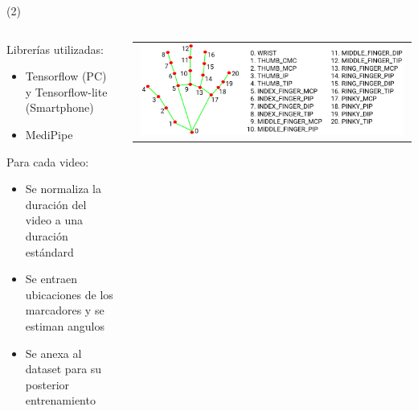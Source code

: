 \begin{frame}{ (2)}
\begin{columns}
\begin{column}{0.6\textwidth}
Librerías utilizadas:
\begin{itemize}
        \item Tensorflow (PC) y Tensorflow-lite (Smartphone)
		\item MediPipe
	\end{itemize}
Para cada video:
\begin{itemize}
        \item Se normaliza la duración del video a una duración estándard
		\item Se entraen ubicaciones de los marcadores y se estiman angulos
		\item Se anexa al dataset para su posterior entrenamiento
	\end{itemize}
\end{column}
\begin{column}{0.4\textwidth}  
\begin{center}
     \begin{tabular}{c}
         \includegraphics[width=0.98\textwidth]{2022_AplicacionLSM/figs/hand_landmarks.png}\\
          \end{tabular}
\end{center}
\end{column} 
\end{columns} 
\end{frame}


